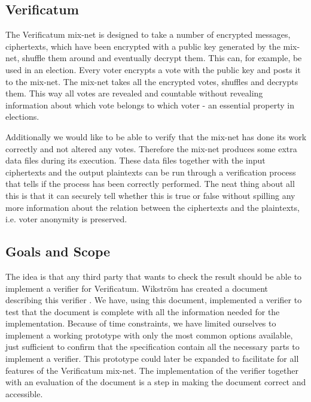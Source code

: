 \subsection{Verificatum}

The Verificatum mix-net is designed to take a number of encrypted
messages, ciphertexts, which have been encrypted with a public key
generated by the mix-net, shuffle them around and eventually decrypt
them. This can, for example, be used in an election. Every voter
encrypts a vote with the public key and posts it to the mix-net. The
mix-net takes all the encrypted votes, shuffles and decrypts
them. This way all votes are revealed and countable without revealing
information about which vote belongs to which voter - an essential
property in elections.

Additionally we would like to be able to verify that the mix-net has
done its work correctly and not altered any votes. Therefore the
mix-net produces some extra data files during its execution. These
data files together with the input ciphertexts and the output
plaintexts can be run through a verification process that tells if the
process has been correctly performed. The neat thing about all this is
that it can securely tell whether this is true or false without
spilling any more information about the relation between the
ciphertexts and the plaintexts, i.e. voter anonymity is preserved.

\subsection{Goals and Scope}

The idea is that any third party that wants to check the result should
be able to implement a verifier for Verificatum. Wikström has created
a document describing this verifier \cite{wikstrom1}. We have, using
this document, implemented a verifier to test that the document is
complete with all the information needed for the
implementation. Because of time constraints, we have limited ourselves
to implement a working prototype with only the most common options
available, just sufficient to confirm that the specification contain
all the necessary parts to implement a verifier. This prototype could
later be expanded to facilitate for all features of the Verificatum
mix-net. The implementation of the verifier together with an
evaluation of the document is a step in making the document correct
and accessible.
